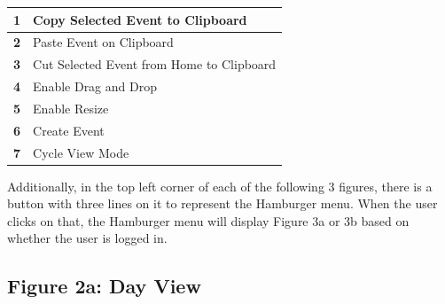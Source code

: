 \documentclass{scrreprt}
\begin{document}
\begin{center}
\begin{longtable}{ | p{0.3cm} | p{7.5cm} | }
\hline
\textbf{1} & Copy Selected Event to Clipboard \\
\hline
\textbf{2} & Paste Event on Clipboard \\
\hline
\textbf{3} & Cut Selected Event from Home to Clipboard \\
\hline
\textbf{4} & Enable Drag and Drop \\
\hline
\textbf{5} & Enable Resize \\
\hline
\textbf{6} & Create Event \\
\hline
\textbf{7} & Cycle View Mode \\
\hline
\end{longtable}
\end{center}

Additionally, in the top left corner of each of the following 3 figures, there is a button with three lines on it to represent the Hamburger menu.  When the user clicks on that, the Hamburger menu will display Figure 3a or 3b based on whether the user is logged in.

\subsection{Figure 2a: Day View}
\end{document}

